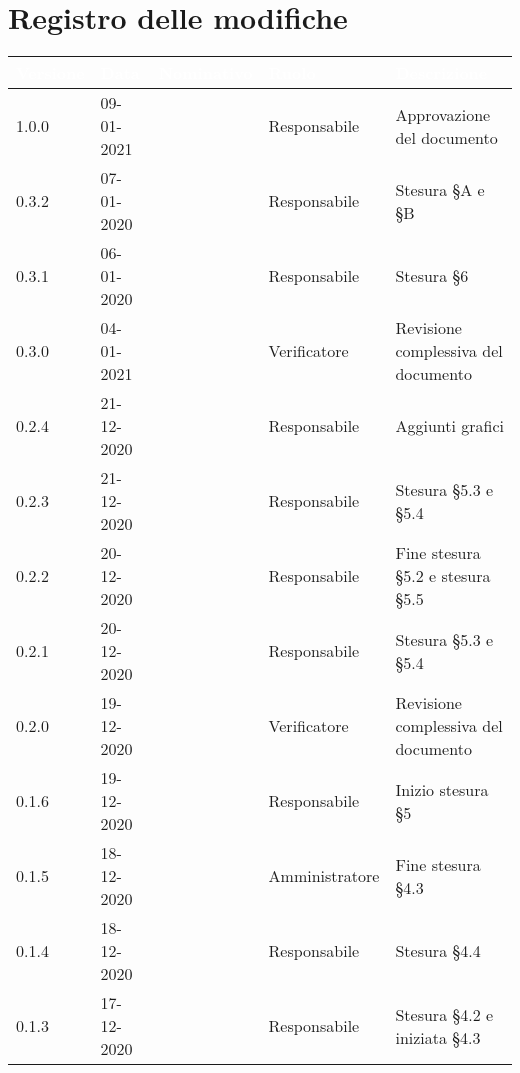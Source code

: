 \section*{Registro delle modifiche}
{
\setcounter{table}{-1}
{
\renewcommand{\arraystretch}{1.5}
\centering
\begin{longtable}{C{1.7cm} C{2.5cm} C{3.2cm} C{2.7cm} C{4.8cm}}
\textcolor{white}{\textbf{Versione}}&
\textcolor{white}{\textbf{Data}}&
\textcolor{white}{\textbf{Nominativo}}&
\textcolor{white}{\textbf{Ruolo}}&
\textcolor{white}{\textbf{Descrizione}}\\	
\endhead

1.0.0 & 09-01-2021 & \SG{} & Responsabile & Approvazione del documento \\

0.3.2 & 07-01-2020 & \BM{} & Responsabile & Stesura \S A e \S B \\

0.3.1 & 06-01-2020 & \BM{} & Responsabile & Stesura \S 6\\

0.3.0 & 04-01-2021 & \SH{} & Verificatore & Revisione complessiva del documento \\

0.2.4 & 21-12-2020 & \SG{} & Responsabile & Aggiunti grafici \\

0.2.3 & 21-12-2020 & \BM{} & Responsabile & Stesura \S 5.3 e \S 5.4\\

0.2.2 & 20-12-2020 & \SG{} & Responsabile & Fine stesura \S 5.2 e stesura \S 5.5 \\

0.2.1 & 20-12-2020 & \BM{} & Responsabile & Stesura \S 5.3 e \S 5.4\\

0.2.0 & 19-12-2020 & \ZM{} & Verificatore & Revisione complessiva del documento \\

0.1.6 & 19-12-2020 & \SG{} & Responsabile & Inizio stesura \S 5 \\

0.1.5 & 18-12-2020 & \PA{} & Amministratore & Fine stesura \S 4.3\\

0.1.4 & 18-12-2020 & \SG{} & Responsabile & Stesura \S 4.4 \\

0.1.3 & 17-12-2020 & \BM{} & Responsabile & Stesura \S 4.2 e iniziata \S 4.3 \\


\end{longtable}}}
